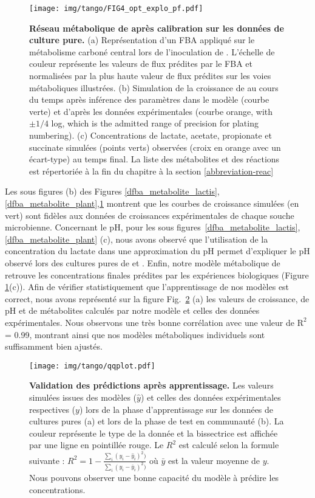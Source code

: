 \begin{figure}[htpb!]
    \centering
    \texttt{[image: img/tango/FIG4\_opt\_explo\_pf.pdf]}
    \caption{\textbf{Réseau métabolique de \freud après calibration sur les données de culture pure.} (a) Représentation d'un FBA appliqué sur le métabolisme carboné central lors de l'inoculation de \freud. L'échelle de couleur représente les valeurs de flux prédites par le FBA et normalisées par la plus haute valeur de flux prédites sur les voies métaboliques illustrées. (b) Simulation de la croissance de \freud au cours du temps après inférence des paramètres dans le modèle (courbe verte) et d'après les données expérimentales (courbe orange, with $\pm 1/4$ log, which is the admitted range of precision for plating numbering). (c) Concentrations de lactate, acetate, propionate et succinate simulées (points verts) observées (croix en orange avec un écart-type) au temps final. La liste des métabolites et des réactions est répertoriée à la fin du chapitre à la section \ref{abbreviation-reac}
    }
    \label{dfba_metabolite_freud}
\end{figure}


Les sous figures (b) des Figures \ref{dfba_metabolite_lactis},\ref{dfba_metabolite_plant},\ref{dfba_metabolite_freud} montrent que les courbes de croissance simulées (en vert) sont fidèles aux données de croissances expérimentales de chaque souche microbienne. Concernant le pH, pour les sous figures~\ref{dfba_metabolite_lactis}, \ref{dfba_metabolite_plant} (c), nous avons observé que l'utilisation de la concentration du lactate dans une approximation du pH permet d'expliquer le pH observé lors des cultures pures de \lactis et \plantarum. Enfin, notre modèle métabolique de \freud retrouve les concentrations finales prédites par les expériences biologiques (Figure \ref{dfba_metabolite_freud}(c)). Afin de vérifier statistiquement que l'apprentissage de nos modèles est correct, nous avons représenté sur la figure Fig.~\ref{fig:qqplot} (a) les valeurs de croissance, de pH et de métabolites calculés par notre modèle et celles des données expérimentales. Nous observons une très bonne corrélation avec une valeur de $\text{R}^2$ = 0.99, montrant ainsi que nos modèles métaboliques individuels sont suffisamment bien ajustés. \\

\begin{figure}[h!]
    \centering
    \texttt{[image: img/tango/qqplot.pdf]}
    \caption{\textbf{Validation des prédictions après apprentissage.} Les valeurs simulées issues des modèles ($\hat{y}$) et celles des données expérimentales respectives ($y$) lors de la phase d'apprentissage sur les données de cultures pures (a) et lors de la phase de test en communauté (b). La couleur représente le type de la donnée et la bissectrice est affichée par une ligne en pointillée rouge. Le $R^2$ est calculé selon la formule suivante : $R^2 = 1 - \frac{\sum_i (y_i - \hat{y}_i)^2)}{\sum_i (y_i - \bar{y}_i)^2)}$ où $\bar{y}$ est la valeur moyenne de $y$. Nous pouvons observer une bonne capacité du modèle à prédire les concentrations.}
    \label{fig:qqplot}
\end{figure}


